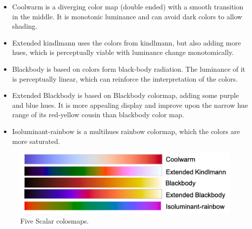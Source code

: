 \documentclass[hyperref, plainreport, noproblem]{cgvpub1}
\begin{document}
\begin{itemize}
	\item Coolwarm is a diverging color map (double ended) with a smooth transition in the middle. It is monotonic luminance and can avoid dark colors to allow shading. 

	\item Extended kindlmann uses the colors from kindlmann, but also adding more hues, which is perceptually viable with luminance change monotomically. 

	\item Blackbody is based on colors form black-body radiation. The luminance of it is perceptually linear, which can reinforce the imterpretation of the colors.

	\item Extended Blackbody is based on Blackbody colormap, adding some purple and blue hues. It is more appealing display and improve upon the narrow hue range of its red-yellow cousin than blackbody color map. 

	\item Isoluminant-rainbow is a multihues rainbow colormap, which the colors are more saturated.
\end{itemize}
\begin{figure}[ht]
    \centering
    \includegraphics[width = 0.8\columnwidth]{1}
    \caption{ Five Scalar colosmaps.}
    \label{fig:1}
\end{figure}	
\end{document}
